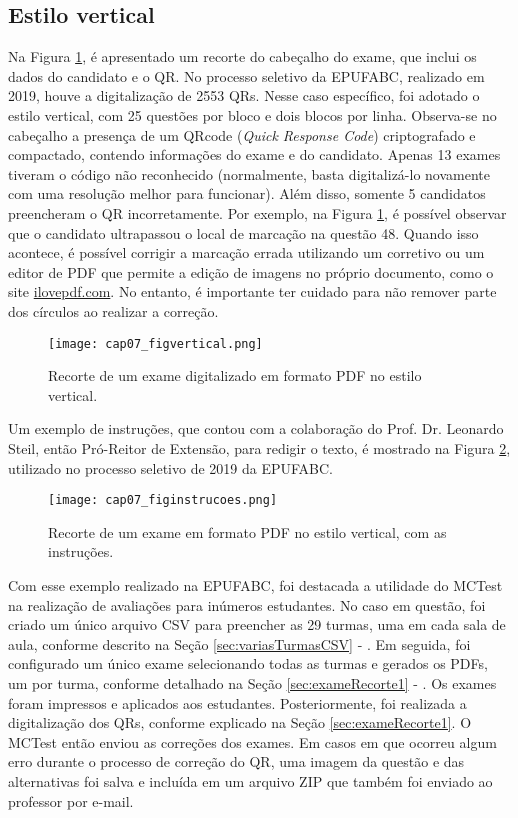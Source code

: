 \subsection{Estilo vertical}

Na Figura \ref{fig:cap07_figvertical}, é apresentado um recorte do cabeçalho do exame, que inclui os dados do candidato e o QR. No processo seletivo da EPUFABC, realizado em 2019, houve a digitalização de 2553 QRs. Nesse caso específico, foi adotado o estilo vertical, com 25 questões por bloco e dois blocos por linha. Observa-se no cabeçalho a presença de um QRcode (\textit{Quick Response Code}) criptografado e compactado, contendo informações do exame e do candidato. Apenas 13 exames tiveram o código não reconhecido (normalmente, basta digitalizá-lo novamente com uma resolução melhor para funcionar). Além disso, somente 5 candidatos preencheram o QR incorretamente. Por exemplo, na Figura \ref{fig:cap07_figvertical}, é possível observar que o candidato ultrapassou o local de marcação na questão 48. Quando isso acontece, é possível corrigir a marcação errada utilizando um corretivo ou um editor de PDF que permite a edição de imagens no próprio documento, como o site \href{https://www.ilovepdf.com/pt/editar-pdf}{ilovepdf.com}. No entanto, é importante ter cuidado para não remover parte dos círculos ao realizar a correção.

\begin{figure}[htbp]
  \centering
  \texttt{[image: cap07\_figvertical.png]}
    \caption{Recorte de um exame digitalizado em formato PDF no estilo vertical.}
 \label{fig:cap07_figvertical}
\end{figure}

Um exemplo de instruções, que contou com a colaboração do Prof. Dr. Leonardo Steil, então Pró-Reitor de Extensão, para redigir o texto, é mostrado na Figura \ref{fig:cap07_figinstrucoes}, utilizado no processo seletivo de 2019 da EPUFABC.

\begin{figure}[htbp]
  \centering
  \texttt{[image: cap07\_figinstrucoes.png]}
    \caption{Recorte de um exame em formato PDF no estilo vertical, com as instruções.}
 \label{fig:cap07_figinstrucoes}
\end{figure}

Com esse exemplo realizado na EPUFABC, foi destacada a utilidade do MCTest na realização de avaliações para inúmeros estudantes. No caso em questão, foi criado um único arquivo CSV para preencher as 29 turmas, uma em cada sala de aula, conforme descrito na Seção \ref{sec:variasTurmasCSV} - \textit{}. Em seguida, foi configurado um único exame selecionando todas as turmas e gerados os PDFs, um por turma, conforme detalhado na Seção \ref{sec:exameRecorte1} - \textit{}. Os exames foram impressos e aplicados aos estudantes. Posteriormente, foi realizada a digitalização dos QRs, conforme explicado na Seção \ref{sec:exameRecorte1}. O MCTest então enviou as correções dos exames. Em casos em que ocorreu algum erro durante o processo de correção do QR, uma imagem da questão e das alternativas foi salva e incluída em um arquivo ZIP que também foi enviado ao professor por e-mail.

